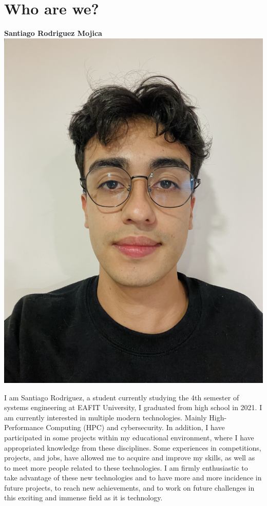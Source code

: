 \documentclass[11pt,a4paper,twocolumn]{article}
\begin{document}
\setlength{\parindent}{4em}
%



\section{Who are we?}
\begin{center}
    \textbf{Santiago Rodriguez Mojica}
	\includegraphics[width = .45\linewidth]{Images/Santiago Rodriguez.jpeg}
\end{center}
I am Santiago Rodriguez, a student currently studying the 4th semester of systems engineering at EAFIT University, I graduated from high school in 2021. I am currently interested in multiple modern technologies. Mainly High-Performance Computing (HPC) and cybersecurity. In addition, I have participated in some projects within my educational environment, where I have appropriated knowledge from these disciplines. Some experiences in competitions, projects, and jobs, have allowed me to acquire and improve my skills, as well as to meet more people related to these technologies. I am firmly enthusiastic to take advantage of these new technologies and to have more and more incidence in future projects, to reach new achievements, and to work on future challenges in this exciting and immense field as it is technology.
\end{document}
